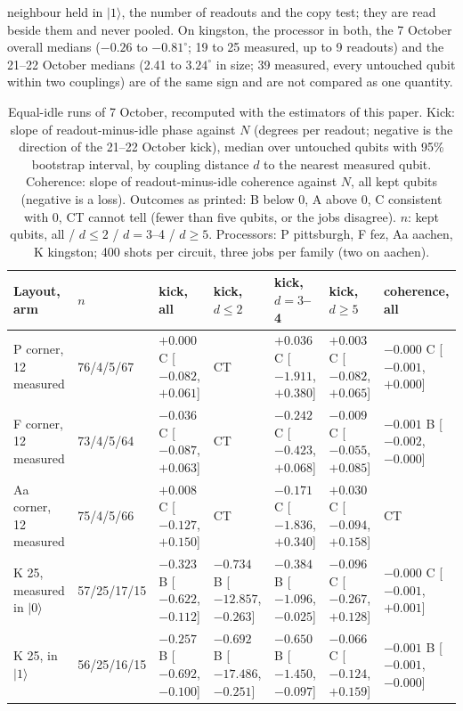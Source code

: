 \documentclass[reprint,amsmath,amssymb,aps,superscriptaddress,nofootinbib]{revtex4-2}
\begin{document}
neighbour held in $|1\rangle$, the number of readouts and the copy test; they are read beside them and never pooled. On kingston, the processor in both, the 7 October overall medians ($-0.26$ to $-0.81^\circ$; 19 to 25 measured, up to 9 readouts) and the 21--22 October medians (2.41 to $3.24^\circ$ in size; 39 measured, every untouched qubit within two couplings) are of the same sign and are not compared as one quantity.

\begin{table}[!tp]
\caption{Equal-idle runs of 7 October, recomputed with the estimators of this paper. Kick: slope of readout-minus-idle phase against $N$ (degrees per readout; negative is the direction of the 21--22 October kick), median over untouched qubits with 95\% bootstrap interval, by coupling distance $d$ to the nearest measured qubit. Coherence: slope of readout-minus-idle coherence against $N$, all kept qubits (negative is a loss). Outcomes as printed: B below 0, A above 0, C consistent with 0, CT cannot tell (fewer than five qubits, or the jobs disagree). $n$: kept qubits, all / $d\le2$ / $d=3$--4 / $d\ge5$. Processors: P pittsburgh, F fez, Aa aachen, K kingston; 400 shots per circuit, three jobs per family (two on aachen).}
\label{tab:oct07}
\scriptsize
\begin{tabular}{p{3.6cm}p{1.6cm}p{2.15cm}p{2.15cm}p{2.15cm}p{2.15cm}p{2.15cm}}
\hline\hline
Layout, arm & $n$ & kick, all & kick, $d\le2$ & kick, $d=3$--4 & kick, $d\ge5$ & coherence, all \\
\hline
P corner, 12 measured & 76/4/5/67 & $+0.000$ C [$-0.082$,$+0.061$] & CT & $+0.036$ C [$-1.911$,$+0.380$] & $+0.003$ C [$-0.082$,$+0.065$] & $-0.000$ C [$-0.001$,$+0.000$] \\
F corner, 12 measured & 73/4/5/64 & $-0.036$ C [$-0.087$,$+0.063$] & CT & $-0.242$ C [$-0.423$,$+0.068$] & $-0.009$ C [$-0.055$,$+0.085$] & $-0.001$ B [$-0.002$,$-0.000$] \\
Aa corner, 12 measured & 75/4/5/66 & $+0.008$ C [$-0.127$,$+0.150$] & CT & $-0.171$ C [$-1.836$,$+0.340$] & $+0.030$ C [$-0.094$,$+0.158$] & CT \\
K 25, measured in $|0\rangle$ & 57/25/17/15 & $-0.323$ B [$-0.622$,$-0.112$] & $-0.734$ B [$-12.857$,$-0.263$] & $-0.384$ B [$-1.096$,$-0.025$] & $-0.096$ C [$-0.267$,$+0.128$] & $-0.000$ C [$-0.001$,$+0.001$] \\
K 25, in $|1\rangle$ & 56/25/16/15 & $-0.257$ B [$-0.692$,$-0.100$] & $-0.692$ B [$-17.486$,$-0.251$] & $-0.650$ B [$-1.450$,$-0.097$] & $-0.066$ C [$-0.124$,$+0.159$] & $-0.001$ B [$-0.001$,$-0.000$] \\

\end{tabular}
\end{table}
\end{document}

